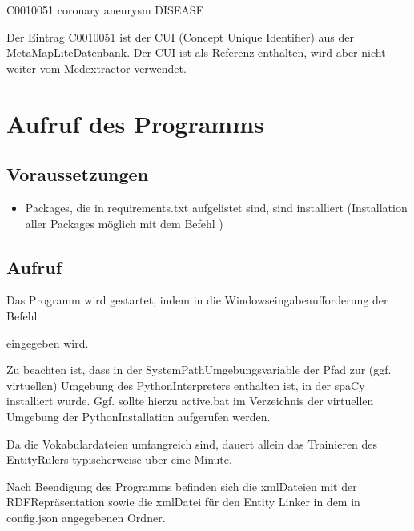 \documentclass[letterpaper,10pt,english]{sphinxmanual}
\begin{document}
\sphinxAtStartPar
C0010051 coronary aneurysm DISEASE

\sphinxAtStartPar
Der Eintrag C0010051 ist der CUI (Concept Unique Identifier) aus der
MetaMapLite\sphinxhyphen{}Datenbank. Der CUI ist als Referenz enthalten, wird aber
nicht weiter vom Medextractor verwendet.


\chapter{Aufruf des Programms}
\label{\detokenize{readme:aufruf-des-programms}}

\section{Voraussetzungen}
\label{\detokenize{readme:voraussetzungen}}\begin{itemize}
\item {} 
\sphinxAtStartPar
Packages, die in requirements.txt aufgelistet sind, sind installiert
(Installation aller Packages möglich mit dem Befehl
)

\end{itemize}


\section{Aufruf}
\label{\detokenize{readme:aufruf}}
\sphinxAtStartPar
Das Programm wird gestartet, indem in die Windowseingabeaufforderung der
Befehl

\sphinxAtStartPar
{}

\sphinxAtStartPar
eingegeben wird.

\sphinxAtStartPar
Zu beachten ist, dass in der System\sphinxhyphen{}Path\sphinxhyphen{}Umgebungsvariable der Pfad zur
(ggf. virtuellen) Umgebung des Python\sphinxhyphen{}Interpreters enthalten ist, in der
spaCy installiert wurde. Ggf. sollte hierzu active.bat im Verzeichnis
der virtuellen Umgebung der Python\sphinxhyphen{}Installation aufgerufen werden.

\sphinxAtStartPar
Da die Vokabulardateien umfangreich sind, dauert allein das Trainieren
des Entity\sphinxhyphen{}Rulers typischerweise über eine Minute.

\sphinxAtStartPar
Nach Beendigung des Programms befinden sich die xml\sphinxhyphen{}Dateien mit der
RDF\sphinxhyphen{}Repräsentation sowie die xml\sphinxhyphen{}Datei für den Entity Linker in dem in
config.json angegebenen Ordner.
\end{document}
